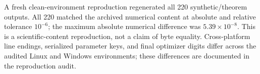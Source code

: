 \documentclass[manuscript,screen,review]{jair}
\begin{document}
A fresh clean-environment reproduction regenerated all 220 synthetic/theorem
outputs.  All 220 matched the archived numerical content at absolute and
relative tolerance $10^{-6}$; the maximum absolute numerical difference was
$5.39\times10^{-8}$.  This is a scientific-content reproduction, not a claim
of byte equality.  Cross-platform line endings, serialized parameter keys,
and final optimizer digits differ across the audited Linux and Windows
environments; these differences are documented in the reproduction audit.

\appendix


\printbibliography


\end{document}
